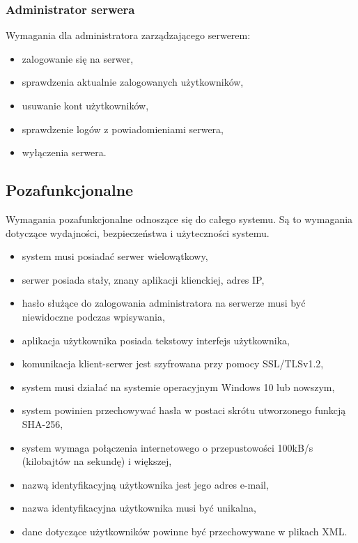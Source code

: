 \documentclass[12pt,a4paper]{article}
\begin{document}
	\subsubsection{Administrator serwera}
	\par Wymagania dla administratora zarządzającego serwerem:
	\begin{itemize}
		\item zalogowanie się na serwer,
		\item sprawdzenia aktualnie zalogowanych użytkowników,
		\item usuwanie kont użytkowników,
		\item sprawdzenie logów z powiadomieniami serwera,
		\item wyłączenia serwera.
	\end{itemize}
	
	\subsection{Pozafunkcjonalne}
	Wymagania pozafunkcjonalne odnoszące się do całego systemu. Są to wymagania dotyczące wydajności, bezpieczeństwa i użyteczności systemu.
	\begin{itemize}
		\item system musi posiadać serwer wielowątkowy,
		\item serwer posiada stały, znany aplikacji klienckiej, adres IP,
		\item hasło służące do zalogowania administratora na serwerze musi być niewidoczne podczas wpisywania,
		\item aplikacja użytkownika posiada tekstowy interfejs użytkownika,
		\item komunikacja klient-serwer jest szyfrowana przy pomocy SSL/TLSv1.2,
		\item system musi działać na systemie operacyjnym Windows 10 lub nowszym,
		\item system powinien przechowywać hasła w postaci skrótu utworzonego funkcją SHA-256,
		\item system wymaga połączenia internetowego o przepustowości 100kB/s (kilobajtów na sekundę) i większej,
		\item nazwą identyfikacyjną użytkownika jest jego adres e-mail,
		\item nazwa identyfikacyjna użytkownika musi być unikalna, 
		\item dane dotyczące użytkowników powinne być przechowywane w plikach XML.
	\end{itemize}
	
\end{document}
